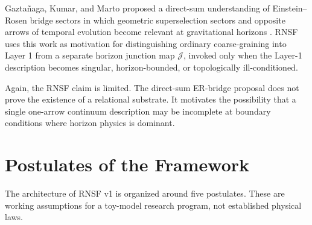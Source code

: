 \documentclass[11pt]{article}
\newcommand{\Jmap}{\mathcal{J}}
\begin{document}
Gazta\~naga, Kumar, and Marto proposed a direct-sum understanding of Einstein--Rosen bridge sectors in which geometric superselection sectors and opposite arrows of temporal evolution become relevant at gravitational horizons \cite{Gaztanaga2026}. RNSF uses this work as motivation for distinguishing ordinary coarse-graining into Layer 1 from a separate horizon junction map \(\Jmap\), invoked only when the Layer-1 description becomes singular, horizon-bounded, or topologically ill-conditioned.

Again, the RNSF claim is limited. The direct-sum ER-bridge proposal does not prove the existence of a relational substrate. It motivates the possibility that a single one-arrow continuum description may be incomplete at boundary conditions where horizon physics is dominant.

\section{Postulates of the Framework}

The architecture of RNSF v1 is organized around five postulates. These are working assumptions for a toy-model research program, not established physical laws.
\end{document}
